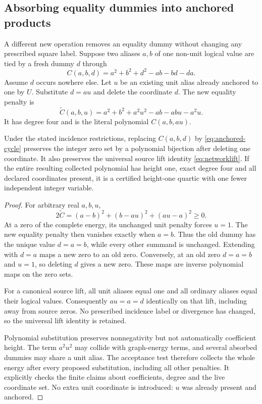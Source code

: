 \subsection{Absorbing equality dummies into anchored products}
A different new operation removes an equality dummy without changing any
prescribed square label. Suppose two aliases $a,b$ of one non-unit logical
value are tied by a fresh dummy $d$ through
\[
 C(a,b,d)=a^2+b^2+d^2-ab-bd-da.
\]
Assume $d$ occurs nowhere else. Let $u$ be an existing unit alias already
anchored to one by $U$. Substitute $d=au$ and delete the coordinate $d$.
The new equality penalty is
\begin{equation}\label{eq:anchored-cycle}
 \widetilde C(a,b,u)
 =a^2+b^2+a^2u^2-ab-abu-a^2u.
\end{equation}
It has degree four and is the literal polynomial $C(a,b,au)$.

\begin{theorem}\label{thm:anchored-equality}
Under the stated incidence restrictions, replacing $C(a,b,d)$ by
\eqref{eq:anchored-cycle} preserves the integer zero set by a polynomial
bijection after deleting one coordinate. It also preserves the universal
source lift identity \eqref{eq:networklift}. If the entire resulting
collected polynomial has height one, exact degree four and all declared
coordinates present, it is a certified height-one quartic with one fewer
independent integer variable.
\end{theorem}
\begin{proof}
For arbitrary real $a,b,u$,
\[
 2\widetilde C=(a-b)^2+(b-au)^2+(au-a)^2\ge0.
\]
At a zero of the complete energy, its unchanged unit penalty forces
$u=1$. The new equality penalty then vanishes exactly when $a=b$.
Thus the old dummy has the unique value $d=a=b$, while every other
summand is unchanged. Extending with $d=a$ maps a new zero to an old
zero. Conversely, at an old zero $d=a=b$ and $u=1$, so deleting $d$
gives a new zero. These maps are inverse polynomial maps on the zero sets.

For a canonical source lift, all unit aliases equal one and all ordinary
aliases equal their logical values. Consequently $au=a=d$ identically
on that lift, including away from source zeros. No prescribed incidence
label or divergence has changed, so the universal lift identity is retained.

Polynomial substitution preserves nonnegativity but not automatically
coefficient height. The term $a^2u^2$ may collide with graph-energy terms,
and several absorbed dummies may share a unit alias. The acceptance test
therefore collects the whole energy after every proposed substitution,
including all other penalties. It explicitly checks the finite claims
about coefficients, degree and the live coordinate set. No extra unit
coordinate is introduced: $u$ was already present and anchored.
\end{proof}

